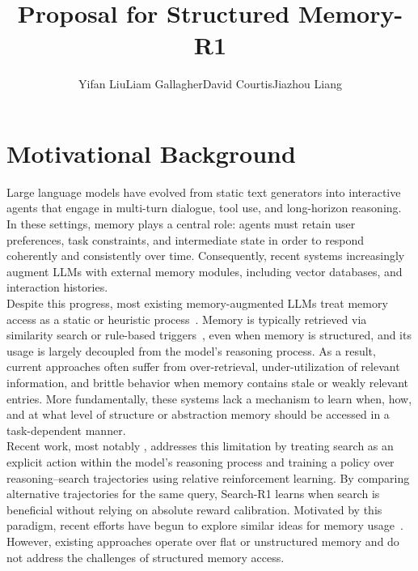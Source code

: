 \documentclass{article}
\title{Proposal for 
Structured Memory-R1}
\author{Yifan Liu\And Liam Gallagher\And David Courtis\And Jiazhou Liang}
\begin{document}
\maketitle

\section{Motivational Background}
Large language models have evolved from static text generators into interactive agents that engage in multi-turn dialogue, tool use, and long-horizon reasoning. In these settings, memory plays a central role: agents must retain user preferences, task constraints, and intermediate state in order to respond coherently and consistently over time. Consequently, recent systems increasingly augment LLMs with external memory modules, including vector databases, and interaction histories.\\

Despite this progress, most existing memory-augmented LLMs treat memory access as a static or heuristic process~\citep{lewis2020retrieval}. Memory is typically retrieved via similarity search or rule-based triggers~\citep{khandelwal2020generalization}, even when memory is structured, and its usage is largely decoupled from the model’s reasoning process. As a result, current approaches often suffer from over-retrieval, under-utilization of relevant information, and brittle behavior when memory contains stale or weakly relevant entries. More fundamentally, these systems lack a mechanism to learn when, how, and at what level of structure or abstraction memory should be accessed in a task-dependent manner.\\

Recent work, most notably \citet{jin2025search}, addresses this limitation by treating search as an explicit action within the model’s reasoning process and training a policy over reasoning–search trajectories using relative reinforcement learning. By comparing alternative trajectories for the same query, Search-R1 learns when search is beneficial without relying on absolute reward calibration. Motivated by this paradigm, recent efforts have begun to explore similar ideas for memory usage~\citep{yan2025memory}. However, existing approaches operate over flat or unstructured memory and do not address the challenges of structured memory access.\\
\end{document}
